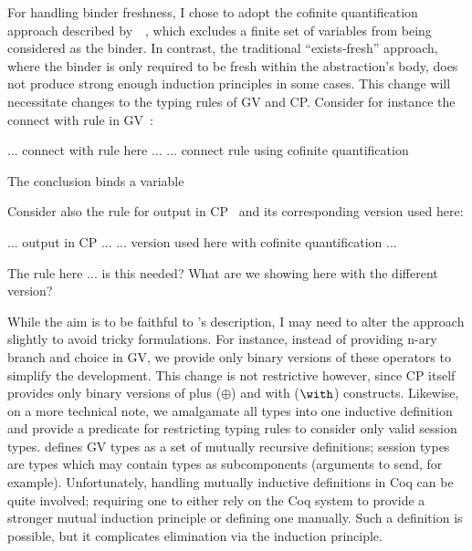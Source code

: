 \documentclass{mprop}
\newcommand{\1}{\textbf{1}\xspace}
\begin{document}
For handling binder freshness, I chose to adopt the cofinite quantification
approach described by~\cite{Aydemir:2008:EFM}~\cite{Aydemir:2008:EFM}, which
excludes a finite set of variables from being considered as the binder. In
contrast, the traditional ``exists-fresh'' approach, where the binder is only
required to be fresh within the abstraction's body, does not produce strong
enough induction principles in some cases. This change will necessitate
changes to the typing rules of GV and CP. Consider for instance the connect
with rule in GV~\cite{Wadler:2012}:

... connect with rule here ... ... connect rule using cofinite quantification

The conclusion binds a variable

Consider also the rule for output in CP~\cite{Wadler:2012} and its
corresponding version used here:

... output in CP ... ... version used here with cofinite quantification ...

The rule here ... is this needed? What are we showing here with the different
version?

While the aim is to be faithful to \citeauthor{Wadler:2012}'s description, I
may need to alter the approach slightly to avoid tricky formulations. For
instance, instead of providing n-ary branch and choice in GV, we provide only
binary versions of these operators to simplify the development. This change is
not restrictive however, since CP itself provides only binary versions of plus
($\oplus$) and with ($\with$) constructs. Likewise, on a more technical note,
we amalgamate all types into one inductive definition and provide a predicate
for restricting typing rules to consider only valid session
types. \citeauthor{Wadler:2012} defines GV types as a set of mutually
recursive definitions; session types are types which may contain types as
subcomponents (arguments to send, for example). Unfortunately, handling
mutually inductive definitions in Coq can be quite involved; requiring one to
either rely on the Coq system to provide a stronger mutual induction principle
or defining one manually. Such a definition is possible, but it complicates
elimination via the induction principle.
\end{document}
